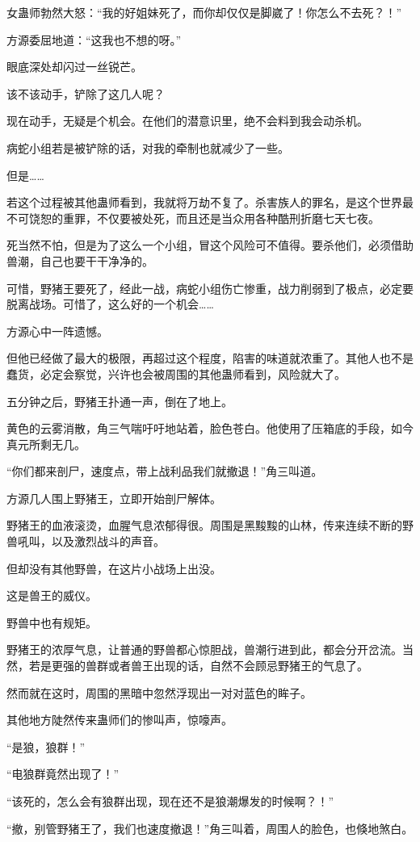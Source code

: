 \begin{this_body}
女蛊师勃然大怒：“我的好姐妹死了，而你却仅仅是脚崴了！你怎么不去死？！”

方源委屈地道：“这我也不想的呀。”

眼底深处却闪过一丝锐芒。

该不该动手，铲除了这几人呢？

现在动手，无疑是个机会。在他们的潜意识里，绝不会料到我会动杀机。

病蛇小组若是被铲除的话，对我的牵制也就减少了一些。

但是……

若这个过程被其他蛊师看到，我就将万劫不复了。杀害族人的罪名，是这个世界最不可饶恕的重罪，不仅要被处死，而且还是当众用各种酷刑折磨七天七夜。

死当然不怕，但是为了这么一个小组，冒这个风险可不值得。要杀他们，必须借助兽潮，自己也要干干净净的。

可惜，野猪王要死了，经此一战，病蛇小组伤亡惨重，战力削弱到了极点，必定要脱离战场。可惜了，这么好的一个机会……

方源心中一阵遗憾。

但他已经做了最大的极限，再超过这个程度，陷害的味道就浓重了。其他人也不是蠢货，必定会察觉，兴许也会被周围的其他蛊师看到，风险就大了。

五分钟之后，野猪王扑通一声，倒在了地上。

黄色的云雾消散，角三气喘吁吁地站着，脸色苍白。他使用了压箱底的手段，如今真元所剩无几。

“你们都来剖尸，速度点，带上战利品我们就撤退！”角三叫道。

方源几人围上野猪王，立即开始剖尸解体。

野猪王的血液滚烫，血腥气息浓郁得很。周围是黑黢黢的山林，传来连续不断的野兽吼叫，以及激烈战斗的声音。

但却没有其他野兽，在这片小战场上出没。

这是兽王的威仪。

野兽中也有规矩。

野猪王的浓厚气息，让普通的野兽都心惊胆战，兽潮行进到此，都会分开岔流。当然，若是更强的兽群或者兽王出现的话，自然不会顾忌野猪王的气息了。

然而就在这时，周围的黑暗中忽然浮现出一对对蓝色的眸子。

其他地方陡然传来蛊师们的惨叫声，惊嚎声。

“是狼，狼群！”

“电狼群竟然出现了！”

“该死的，怎么会有狼群出现，现在还不是狼潮爆发的时候啊？！”

“撤，别管野猪王了，我们也速度撤退！”角三叫着，周围人的脸色，也倏地煞白。


\end{this_body}
